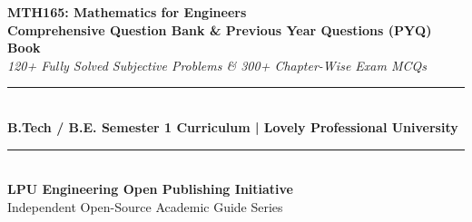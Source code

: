 \begin{titlepage}
\centering
\vspace*{1.5cm}
{\Huge \textbf{\color{LPUNavy}MTH165: Mathematics for Engineers}}\\[0.5cm]
{\LARGE \textbf{\color{LPUOrange}Comprehensive Question Bank \& Previous Year Questions (PYQ) Book}}\\[0.3cm]
{\large \textit{120+ Fully Solved Subjective Problems \& 300+ Chapter-Wise Exam MCQs}}\\[2cm]

\rule{\linewidth}{1.5pt}\\[0.5cm]
{\large \textbf{B.Tech / B.E. Semester 1 Curriculum | Lovely Professional University}}\\[0.5cm]
\rule{\linewidth}{1.5pt}\\[2.5cm]

\vfill
{\large \textbf{LPU Engineering Open Publishing Initiative}}\\[0.2cm]
{\small Independent Open-Source Academic Guide Series}
\end{titlepage}
\newpage
